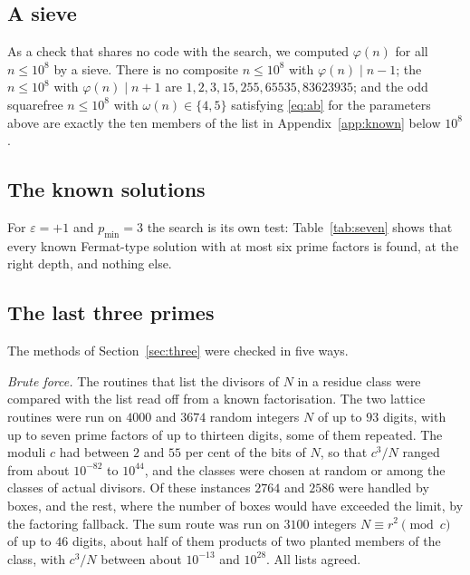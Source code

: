\documentclass[11pt,reqno]{amsart}
\numberwithin{equation}{section}
\theoremstyle{plain}
\theoremstyle{definition}
\theoremstyle{remark}
\begin{document}
\subsection{A sieve}
As a check that shares no code with the search, we computed
$\varphi(n)$ for all $n\le10^8$ by a sieve. There is no composite
$n\le10^8$ with $\varphi(n)\mid n-1$; the $n\le10^8$ with
$\varphi(n)\mid n+1$ are $1,2,3,15,255,65535,83623935$; and the odd
squarefree $n\le10^8$ with $\omega(n)\in\{4,5\}$ satisfying
\eqref{eq:ab} for the parameters above are exactly the ten members of
the list in Appendix~\ref{app:known} below $10^8$.

\subsection{The known solutions}
For $\varepsilon=+1$ and $p_{\min}=3$ the search is its own test:
Table~\ref{tab:seven} shows that every known Fermat-type solution with
at most six prime factors is found, at the right depth, and nothing
else.

\subsection{The last three primes}\label{sec:checks3}
The methods of Section~\ref{sec:three} were checked in five ways.

\emph{Brute force.} The routines that list the divisors of $N$ in a
residue class were compared with the list read off from a known
factorisation. The two lattice routines were run on $4000$ and $3674$
random integers $N$ of up to $93$ digits, with up to seven prime
factors of up to thirteen digits, some of them repeated. The moduli $c$
had between $2$ and $55$ per cent of the bits of $N$, so that $c^3/N$
ranged from about $10^{-82}$ to $10^{44}$, and the classes were chosen
at random or among the classes of actual divisors. Of these instances
$2764$ and $2586$ were handled by boxes, and the rest, where the
number of boxes would have exceeded the limit, by the factoring
fallback. The sum route was run on $3100$ integers
$N\equiv r^2\pmod c$ of up to $46$ digits, about half of them
products of two planted members of the class, with $c^3/N$ between
about $10^{-13}$ and $10^{28}$. All lists agreed.
\end{document}

